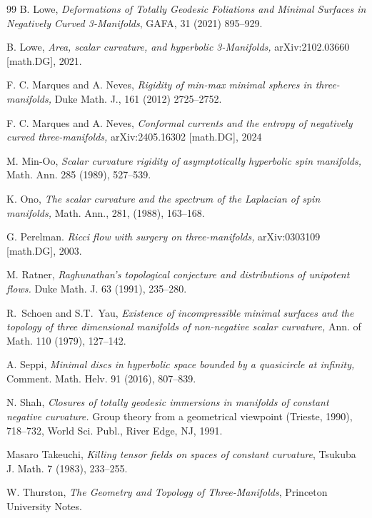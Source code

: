 \documentclass[11pt]{amsart}
\theoremstyle{remark}
\theoremstyle{definition}
\begin{document}
{{\begin{thebibliography}{99}
		 B. Lowe, {\em Deformations of Totally Geodesic Foliations and Minimal Surfaces
			in Negatively Curved 3-Manifolds}, GAFA, 31 (2021) 895--929.
		
		B. Lowe,  {\em Area,  scalar curvature, and hyperbolic 3-Manifolds,} arXiv:2102.03660 [math.DG], 2021.
		
		
		 F. C. Marques and A. Neves, {\em Rigidity of min-max minimal spheres in three-manifolds,} Duke Math. J., 161 (2012) 2725--2752.
		
		 F. C. Marques and A. Neves, {\em Conformal currents and the entropy of negatively curved three-manifolds,} arXiv:2405.16302 [math.DG], 2024


		
		
		M. Min-Oo, 
		{\em Scalar curvature rigidity of asymptotically hyperbolic spin manifolds,} Math. Ann. 285 (1989), 527--539.
		
		
		 K. Ono, {\em The scalar curvature and the spectrum of the Laplacian of spin manifolds,} Math.
		Ann., 281, (1988), 163--168.
		
		 G. Perelman. {\em Ricci flow with surgery on three-manifolds,} arXiv:0303109
		[math.DG], 2003.
		
		
		 M. Ratner, 
		{\em Raghunathan's topological conjecture and distributions of unipotent flows.}
		Duke Math. J. 63 (1991), 235--280.
		
		
		R.~Schoen and S.T.~Yau, \textit{Existence of incompressible minimal surfaces and the topology of three dimensional manifolds of non-negative scalar curvature,} Ann. of Math. 110 (1979), 127--142.
		
		 A. Seppi, 
		{\em Minimal discs in hyperbolic space bounded by a quasicircle at infinity,} 
		Comment. Math. Helv. 91 (2016), 807--839. 
		
		N. Shah, {\em Closures of totally geodesic immersions in manifolds of constant negative curvature.} Group theory from a geometrical viewpoint (Trieste, 1990), 718--732, World Sci. Publ., River Edge, NJ, 1991. 
		
		
		 Masaro Takeuchi, \textit{Killing tensor fields on spaces of constant curvature},
		Tsukuba J. Math. 7 (1983), 233--255. 
		
		 W. Thurston, {\em The Geometry and Topology of Three-Manifolds}, Princeton University Notes.
		

\end{thebibliography}}}
\end{document}
